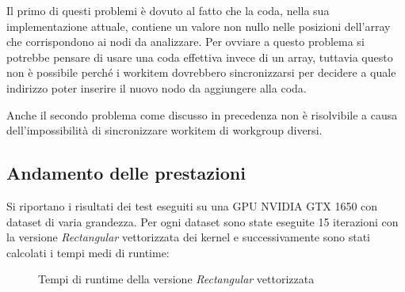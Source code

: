Il primo di questi problemi è dovuto al fatto che la coda, nella sua implementazione attuale, contiene un valore non nullo nelle posizioni dell'array che corrispondono ai nodi da analizzare. Per ovviare a questo problema si potrebbe pensare di usare una coda effettiva invece di un array, tuttavia questo non è possibile perché i workitem dovrebbero sincronizzarsi per decidere a quale indirizzo poter inserire il nuovo nodo da aggiungere alla coda.

Anche il secondo problema come discusso in precedenza non è risolvibile a causa dell'impossibilità di sincronizzare workitem di workgroup diversi.



\subsection{Andamento delle prestazioni}
Si riportano i risultati dei test eseguiti su una GPU NVIDIA GTX 1650 con dataset di varia grandezza. Per ogni dataset sono state eseguite 15 iterazioni con la versione \textit{Rectangular} vettorizzata dei kernel e successivamente sono stati calcolati i tempi medi di runtime:


\begin{figure}[H]
	\caption{Tempi di runtime della versione \textit{Rectangular} vettorizzata}
\end{figure}